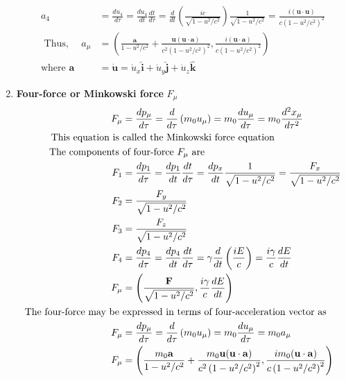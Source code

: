 \begin{enumerate}
\begin{align*}
	a_{4}&=\frac{d u_{4}}{d \tau}=\frac{d u_{4}}{d t} \frac{d t}{d \tau}=\frac{d}{d t}\left(\frac{i c}{\sqrt{1-u^{2} / c^{2}}}\right) \frac{1}{\sqrt{1-u^{2} / c^{2}}}=\frac{i(\mathbf{u} \cdot \mathbf{u})}{c\left(1-u^{2} / c^{2}\right)^{2}}\\
	\text { Thus, } \quad a_{\mu}&=\left(\frac{\mathbf{a}}{1-u^{2} / c^{2}}+\frac{\mathbf{u}(\mathbf{u} \cdot \mathbf{a})}{c^{2}\left(1-u^{2} / c^{2}\right)^{2}}, \frac{i(\mathbf{u} \cdot \mathbf{a})}{c\left(1-u^{2} / c^{2}\right)^{2}}\right)\\
\text{where } \mathbf{a}&=\dot{\mathbf{u}}=\dot{u}_{x} \hat{\mathbf{i}}+\dot{u}_{y} \hat{\mathbf{j}}+\dot{u}_{z} \hat{\mathbf{k}}
	\end{align*}
	\item \textbf { Four-force or Minkowski force } $F_{\mu}$
	\begin{align}
	F_{\mu}&=\frac{d p_{\mu}}{d \tau}=\frac{d}{d \tau}\left(m_{0} u_{\mu}\right)=m_{0} \frac{d u_{\mu}}{d \tau}=m_{0} \frac{d^{2} x_{\mu}}{d \tau^{2}} \notag\\
	\text{This equation is }&\text{called the Minkowski force equation}\notag\\
	\text{The components  }&\text{of four-force $F_{\mu}$ are}\notag\\
	F_{1}&=\frac{d p_{1}}{d \tau}=\frac{d p_{1}}{d t} \frac{d t}{d \tau}=\frac{d p_{x}}{d t} \frac{1}{\sqrt{1-u^{2} / c^{2}}}=\frac{F_{x}}{\sqrt{1-u^{2} / c^{2}}}\notag \\
	F_{2}&=\frac{F_{y}}{\sqrt{1-u^{2} / c^{2}}} \notag\\
	F_{3}&=\frac{F_{z}}{\sqrt{1-u^{2} / c^{2}}} \notag\\
	F_{4}&=\frac{d p_{4}}{d \tau}=\frac{d p_{4}}{d t} \frac{d t}{d \tau}=\gamma \frac{d}{d t}\left(\frac{i E}{c}\right)=\frac{i \gamma}{c} \frac{d E}{d t} \notag\\
	F_{\mu}&=\left(\frac{\mathbf{F}}{\sqrt{1-u^{2} / c^{2}}}, \frac{i \gamma}{c} \frac{d E}{d t}\right) \label{ref.str1}\\
	\text{The four-force may be }&\text{expressed in terms of four-acceleration vector as}\notag\\
	F_{\mu}&=\frac{d p_{\mu}}{d \tau}=\frac{d}{d \tau}\left(m_{0} u_{\mu}\right)=m_{0} \frac{d u_{\mu}}{d \tau}=m_{0} a_{\mu}\notag\\
	F_{\mu}&=\left(\frac{m_{0} \mathbf{a}}{1-u^{2} / c^{2}}+\frac{m_{0} \mathbf{u}(\mathbf{u} \cdot \mathbf{a})}{c^{2}\left(1-u^{2} / c^{2}\right)^{2}}, \frac{i m_{0}(\mathbf{u} \cdot \mathbf{a})}{c\left(1-u^{2} / c^{2}\right)^{2}}\right)\label{ref.str2}\\

\end{align}
\end{enumerate}
